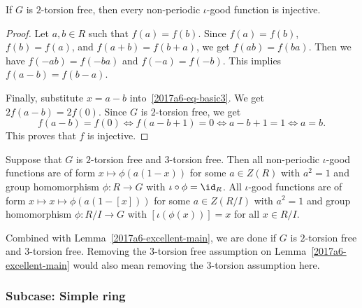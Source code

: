 \begin{lemma}\label{2017a6-nonperiodic-2tf}
If $G$ is $2$-torsion free, then every non-periodic $\iota$-good function is injective.
\end{lemma}
\begin{proof}
Let $a, b \in R$ such that $f(a) = f(b)$.
Since $f(a) = f(b)$, $f(b) = f(a)$, and $f(a + b) = f(b + a)$, we get $f(ab) = f(ba)$.
Then we have $f(-ab) = f(-ba)$ and $f(-a) = f(-b)$.
This implies $f(a - b) = f(b - a)$.

Finally, substitute $x = a - b$ into~\eqref{2017a6-eq-basic3}.
We get $2 f(a - b) = 2 f(0)$.
Since $G$ is $2$-torsion free, we get
\[ f(a - b) = f(0) \iff f(a - b + 1) = 0 \iff a - b + 1 = 1 \iff a = b. \]
This proves that $f$ is injective.
\end{proof}

\begin{corollary}
Suppose that $G$ is $2$-torsion free and $3$-torsion free.
Then all non-periodic $\iota$-good functions are of form $x \mapsto \phi(a(1 - x))$ for some $a \in Z(R)$ with $a^2 = 1$ and group homomorphism $\phi : R \to G$ with $\iota \circ \phi = \id_R$.
All $\iota$-good functions are of form $x \mapsto x \mapsto \phi(a(1 - [x]))$ for some $a \in Z(R/I)$ with $a^2 = 1$ and group homomorphism $\phi : R/I \to G$ with $[\iota(\phi(x))] = x$ for all $x \in R/I$.
\end{corollary}

Combined with Lemma~\ref{2017a6-excellent-main}, we are done if $G$ is $2$-torsion free and $3$-torsion free.
Removing the $3$-torsion free assumption on Lemma~\ref{2017a6-excellent-main} would also mean removing the $3$-torsion assumption here.


\subsubsection*{Subcase: Simple ring}
